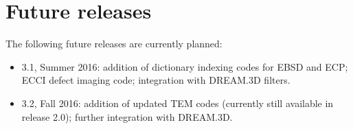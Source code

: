 \documentclass[DIV=calc, paper=letter, fontsize=11pt]{scrartcl}	 %
\begin{document}
\section{Future releases}
The following future releases are currently planned:
\begin{itemize}
	\item 3.1, Summer 2016: addition of dictionary indexing codes for EBSD and ECP; ECCI defect imaging code; integration with DREAM.3D filters.
	\item 3.2, Fall 2016: addition of updated TEM codes (currently still available in release 2.0); further integration with DREAM.3D.
\end{itemize}
\end{document}
